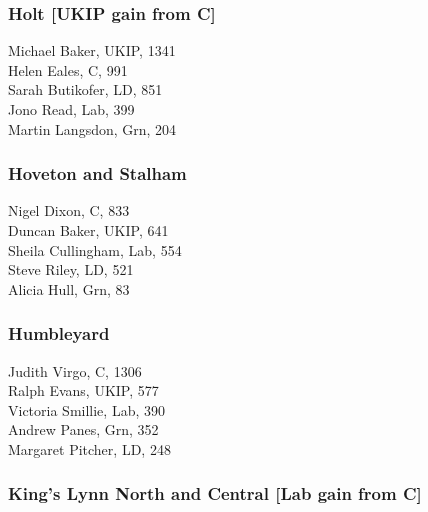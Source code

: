 \documentclass[a4paper,openany,10pt]{book}
\begin{document}
\subsubsection*{Holt \hspace*{\fill}\nolinebreak[1]%
\enspace\hspace*{\fill}
[UKIP gain from C]}



Michael Baker, UKIP, 1341\\
Helen Eales, C, 991\\
Sarah Butikofer, LD, 851\\
Jono Read, Lab, 399\\
Martin Langsdon, Grn, 204\\


\subsubsection*{Hoveton and Stalham}



Nigel Dixon, C, 833\\
Duncan Baker, UKIP, 641\\
Sheila Cullingham, Lab, 554\\
Steve Riley, LD, 521\\
Alicia Hull, Grn, 83\\


\subsubsection*{Humbleyard}



Judith Virgo, C, 1306\\
Ralph Evans, UKIP, 577\\
Victoria Smillie, Lab, 390\\
Andrew Panes, Grn, 352\\
Margaret Pitcher, LD, 248\\


\subsubsection*{King's Lynn North and Central \hspace*{\fill}\nolinebreak[1]%
\enspace\hspace*{\fill}
[Lab gain from C]}
\end{document}
